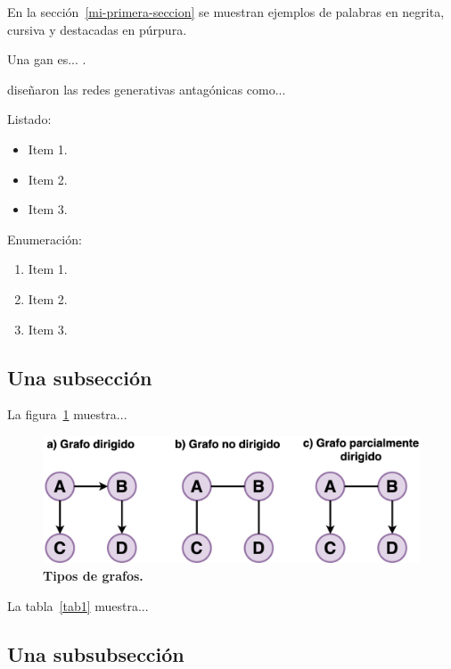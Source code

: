 En la sección~\ref{mi-primera-seccion} se muestran ejemplos de palabras en negrita, cursiva y destacadas en púrpura.
\medskip

Una \acrfull{gan} es... \citep{goodfellow2014generative}.
\medskip

\citet{goodfellow2014generative} diseñaron las redes generativas antagónicas como...
\medskip

\vspace{5ex}

Listado:
\begin{itemize}
  \item Item 1.
  \item Item 2.
  \item Item 3.
\end{itemize}

Enumeración:
\begin{enumerate}
  \item Item 1.
  \item Item 2.
  \item Item 3.
\end{enumerate}

\subsection{Una subsección}
\label{una-subseccion}

La figura~\ref{fig1} muestra...

\begin{figure}[ht!]
    \centering
    \includegraphics[scale=0.15]{figuras/fig1.png}
    \caption[Tipos de grafos]{\textbf{Tipos de grafos.}}
    \label{fig1}
\end{figure}

La tabla~\ref{tab1} muestra...



\subsection{Una subsubsección}
\label{una-subsubseccion}

